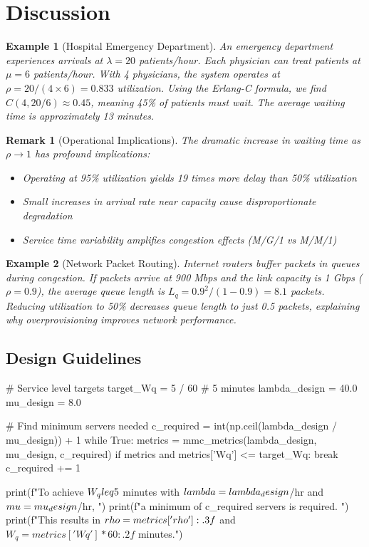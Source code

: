 \documentclass[a4paper, 11pt]{article}
\newtheorem{example}{Example}[section]
\newtheorem{remark}{Remark}[section]
\begin{document}
\section{Discussion}

\begin{example}[Hospital Emergency Department]
An emergency department experiences arrivals at $\lambda = 20$ patients/hour. Each physician can treat patients at $\mu = 6$ patients/hour. With 4 physicians, the system operates at $\rho = 20/(4 \times 6) = 0.833$ utilization. Using the Erlang-C formula, we find $C(4, 20/6) \approx 0.45$, meaning 45\% of patients must wait. The average waiting time is approximately 13 minutes.
\end{example}

\begin{remark}[Operational Implications]
The dramatic increase in waiting time as $\rho \to 1$ has profound implications:
\begin{itemize}
\item Operating at 95\% utilization yields 19 times more delay than 50\% utilization
\item Small increases in arrival rate near capacity cause disproportionate degradation
\item Service time variability amplifies congestion effects (M/G/1 vs M/M/1)
\end{itemize}
\end{remark}

\begin{example}[Network Packet Routing]
Internet routers buffer packets in queues during congestion. If packets arrive at 900 Mbps and the link capacity is 1 Gbps ($\rho = 0.9$), the average queue length is $L_q = 0.9^2/(1-0.9) = 8.1$ packets. Reducing utilization to 50\% decreases queue length to just 0.5 packets, explaining why overprovisioning improves network performance.
\end{example}

\subsection{Design Guidelines}

\begin{pycode}
# Service level targets
target_Wq = 5 / 60  # 5 minutes
lambda_design = 40.0
mu_design = 8.0

# Find minimum servers needed
c_required = int(np.ceil(lambda_design / mu_design)) + 1
while True:
    metrics = mmc_metrics(lambda_design, mu_design, c_required)
    if metrics and metrics['Wq'] <= target_Wq:
        break
    c_required += 1

print(f"To achieve $W_q \\leq 5$ minutes with $\\lambda = {lambda_design}$/hr and $\\mu = {mu_design}$/hr, ")
print(f"a minimum of {c_required} servers is required. ")
print(f"This results in $\\rho = {metrics['rho']:.3f}$ and $W_q = {metrics['Wq']*60:.2f}$ minutes.")
\end{pycode}
\end{document}
